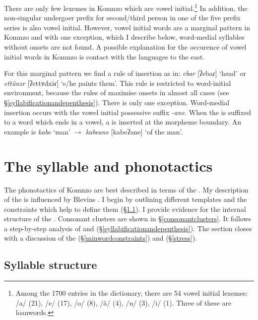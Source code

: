 There are only few lexemes in Komnzo which are vowel initial.\footnote{Among the 1700 entries in the dictionary, there are 54 vowel initial lexemes: /a/ (21), /e/ (17), /o/ (8), /ä/ (4), /u/ (3), /i/ (1). Three of these are loanwords.} In addition, the non-singular undergoer prefix for second/third person in one of the five prefix series is also vowel initial. However, vowel initial words are a marginal pattern in Komnzo and with one exception, which I describe below, word-medial syllables without onsets are not found. A possible explanation for the occurence of vowel initial words in Komnzo is contact with the  languages to the east.%

For this marginal pattern we find a rule of  insertion as in: \emph{ebar} [ʔebaɾ] `head' or \emph{ettünzr} [ʔettʏdzə̆ɾ] `s/he paints them'. This rule is restricted to word-initial environment, because the rules of  maximise onsets in almost all cases (see \S{}\ref{syllabificationandepenthesis}). There is only one exception. Word-medial  insertion occurs with the vowel initial possessive suffix \emph{-ane}. When the  is suffixed to a word which ends in a vowel, a  is inserted at the morpheme boundary. An example is \emph{kabe} `man' $\rightarrow$ \emph{kabeane} [kabeʔane] `of the man'.

\section{The syllable and phonotactics} \label{syllable-and-phonotactics}

The phonotactics of Komnzo are best described in terms of the . My description of the  is influenced by Blevins \citeyearpar{Blevins:1995tt}. I begin by outlining different  templates and the constraints which help to define them (\S{}\ref{syllstruc}). I provide evidence for the internal structure of the . Consonant clusters are shown in \S\ref{consonantclusters}. It follows a step-by-step analysis of  and  (\S{}\ref{syllabificationandepenthesis}). The section closes with a discussion of the  (\S\ref{minwordconstraints}) and  (\S{}\ref{stress}).

\subsection{Syllable structure} \label{syllstruc}

